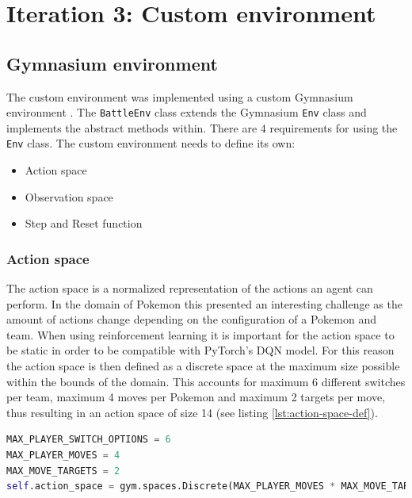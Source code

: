 \section{Iteration 3: Custom environment}
\label{sec:environment}

\subsection{Gymnasium environment}
The custom environment was implemented using a custom Gymnasium \cite{Gymnasium} environment \cite{GymnasiumCustomEnv}.
The \lstinline|BattleEnv| class extends the Gymnasium \lstinline|Env| class and implements the abstract methods within.
There are 4 requirements for using the \lstinline|Env| class. The custom environment needs to define its own:

\begin{itemize}
    \item Action space
    \item Observation space
    \item Step and Reset function
\end{itemize}

\subsubsection{Action space}
The action space is a normalized representation of the actions an agent can perform. In the domain of Pokemon this presented
an interesting challenge as the amount of actions change depending on the configuration of a Pokemon and team. When using
reinforcement learning it is important for the action space to be static in order to be compatible with PyTorch's DQN model.
For this reason the action space is then defined as a discrete space at the maximum size possible within the bounds of the domain.
This accounts for maximum 6 different switches per team, maximum 4 moves per Pokemon and maximum 2 targets per move, thus
resulting in an action space of size 14 (see listing \ref{lst:action-space-def}).

\begin{lstlisting}[basicstyle=\fontsize{10}{10}\selectfont\ttfamily,language=Python,caption={The defined action space.},label=lst:action-space-def,breaklines]
MAX_PLAYER_SWITCH_OPTIONS = 6
MAX_PLAYER_MOVES = 4
MAX_MOVE_TARGETS = 2
self.action_space = gym.spaces.Discrete(MAX_PLAYER_MOVES * MAX_MOVE_TARGETS + MAX_PLAYER_SWITCH_OPTIONS)
\end{lstlisting}

